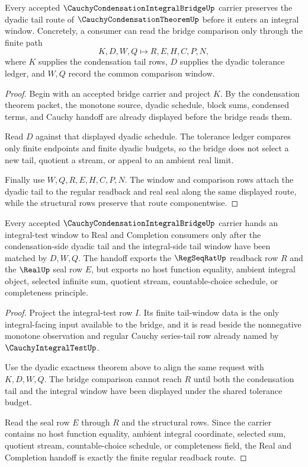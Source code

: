 \begin{theorem}
\label{thm:cauchy-condensation-integral-bridge-dyadic-tail-exactness}
Every accepted $\CauchyCondensationIntegralBridgeUp$ carrier preserves the dyadic tail route of $\CauchyCondensationTheoremUp$ before it enters an integral window. Concretely, a consumer can read the bridge comparison only through the finite path
$$
K,D,W,Q \longmapsto R,E,H,C,P,N,
$$
where $K$ supplies the condensation tail rows, $D$ supplies the dyadic tolerance ledger, and $W,Q$ record the common comparison window.
\end{theorem}
\begin{proof}
Begin with an accepted bridge carrier and project $K$. By the condensation theorem packet, the monotone source, dyadic schedule, block sums, condensed terms, and Cauchy handoff are already displayed before the bridge reads them.

Read $D$ against that displayed dyadic schedule. The tolerance ledger compares only finite endpoints and finite dyadic budgets, so the bridge does not select a new tail, quotient a stream, or appeal to an ambient real limit.

Finally use $W,Q,R,E,H,C,P,N$. The window and comparison rows attach the dyadic tail to the regular readback and real seal along the same displayed route, while the structural rows preserve that route componentwise.
\end{proof}

\begin{theorem}
\label{thm:cauchy-condensation-integral-bridge-integral-window-handoff}
Every accepted $\CauchyCondensationIntegralBridgeUp$ carrier hands an integral-test window to Real and Completion consumers only after the condensation-side dyadic tail and the integral-side tail window have been matched by $D,W,Q$. The handoff exports the $\RegSeqRatUp$ readback row $R$ and the $\RealUp$ seal row $E$, but exports no host function equality, ambient integral object, selected infinite sum, quotient stream, countable-choice schedule, or completeness principle.
\end{theorem}
\begin{proof}
Project the integral-test row $I$. Its finite tail-window data is the only integral-facing input available to the bridge, and it is read beside the nonnegative monotone observation and regular Cauchy series-tail row already named by $\CauchyIntegralTestUp$.

Use the dyadic exactness theorem above to align the same request with $K,D,W,Q$. The bridge comparison cannot reach $R$ until both the condensation tail and the integral window have been displayed under the shared tolerance budget.

Read the seal row $E$ through $R$ and the structural rows. Since the carrier contains no host function equality, ambient integral coordinate, selected sum, quotient stream, countable-choice schedule, or completeness field, the Real and Completion handoff is exactly the finite regular readback route.
\end{proof}


